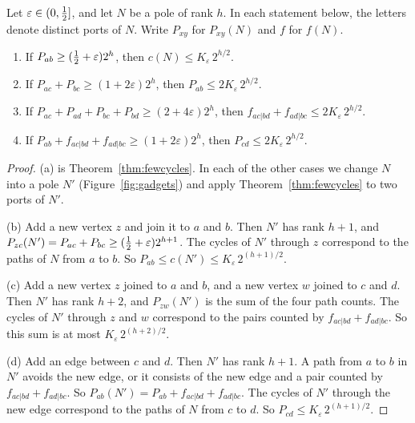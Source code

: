 \begin{lemma}\label{lem:gadgets}
Let $\varepsilon\in(0,\tfrac12]$, and let $N$ be a pole of rank $h$. In each statement below, the
letters denote distinct ports of $N$. Write $P_{xy}$ for $P_{xy}(N)$ and $f$ for $f(N)$.
\begin{enumerate}
\item[\textup{(a)}] If $P_{ab}\ge(\tfrac12+\varepsilon)2^{h}$, then $c(N)\le K_\varepsilon\,2^{h/2}$.
\item[\textup{(b)}] If $P_{ac}+P_{bc}\ge(1+2\varepsilon)2^{h}$, then $P_{ab}\le2K_\varepsilon\,2^{h/2}$.
\item[\textup{(c)}] If $P_{ac}+P_{ad}+P_{bc}+P_{bd}\ge(2+4\varepsilon)2^{h}$, then
$f_{ac|bd}+f_{ad|bc}\le2K_\varepsilon\,2^{h/2}$.
\item[\textup{(d)}] If $P_{ab}+f_{ac|bd}+f_{ad|bc}\ge(1+2\varepsilon)2^{h}$, then
$P_{cd}\le2K_\varepsilon\,2^{h/2}$.
\end{enumerate}
\end{lemma}

\begin{proof}
(a) is Theorem~\ref{thm:fewcycles}. In each of the other cases we change $N$ into a pole $N'$
(Figure~\ref{fig:gadgets}) and apply Theorem~\ref{thm:fewcycles} to two ports of $N'$.

(b) Add a new vertex $z$ and join it to $a$ and $b$. Then $N'$ has rank $h+1$, and
$P_{zc}(N')=P_{ac}+P_{bc}\ge(\tfrac12+\varepsilon)2^{h+1}$. The cycles of $N'$ through $z$
correspond to the paths of $N$ from $a$ to $b$. So
$P_{ab}\le c(N')\le K_\varepsilon\,2^{(h+1)/2}$.

(c) Add a new vertex $z$ joined to $a$ and $b$, and a new vertex $w$ joined to $c$ and $d$. Then
$N'$ has rank $h+2$, and $P_{zw}(N')$ is the sum of the four path counts. The cycles of $N'$
through $z$ and $w$ correspond to the pairs counted by $f_{ac|bd}+f_{ad|bc}$. So this sum is at
most $K_\varepsilon\,2^{(h+2)/2}$.

(d) Add an edge between $c$ and $d$. Then $N'$ has rank $h+1$. A path from $a$ to $b$ in $N'$
avoids the new edge, or it consists of the new edge and a pair counted by
$f_{ac|bd}+f_{ad|bc}$. So $P_{ab}(N')=P_{ab}+f_{ac|bd}+f_{ad|bc}$. The cycles of $N'$ through the
new edge correspond to the paths of $N$ from $c$ to $d$. So
$P_{cd}\le K_\varepsilon\,2^{(h+1)/2}$.
\end{proof}
